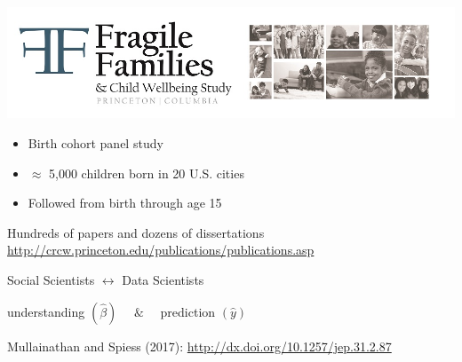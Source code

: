 \documentclass{beamer}
\begin{document}
\begin{frame}

\begin{center}
\includegraphics[width=\textwidth]{figures/ff_logo}
\end{center}

\begin{itemize}
\item Birth cohort panel study
\item $\approx$ 5,000 children born in 20 U.S. cities
\item Followed from birth through age 15
\end{itemize}

\end{frame}
\begin{frame}

Hundreds of papers and dozens of dissertations \vskip 1cm
\scriptsize \url{http://crcw.princeton.edu/publications/publications.asp}

\end{frame}
\begin{frame}

\begin{center}
\large{Social Scientists $\longleftrightarrow$ Data Scientists}
\end{center}
\pause
\begin{center}
\LARGE{
understanding $(\hat{\beta})$ $ \quad \& \quad $ prediction $(\hat{y})$
}
\end{center}

\vfill
Mullainathan and Spiess (2017): \url{http://dx.doi.org/10.1257/jep.31.2.87}
\end{frame}
\end{document}
